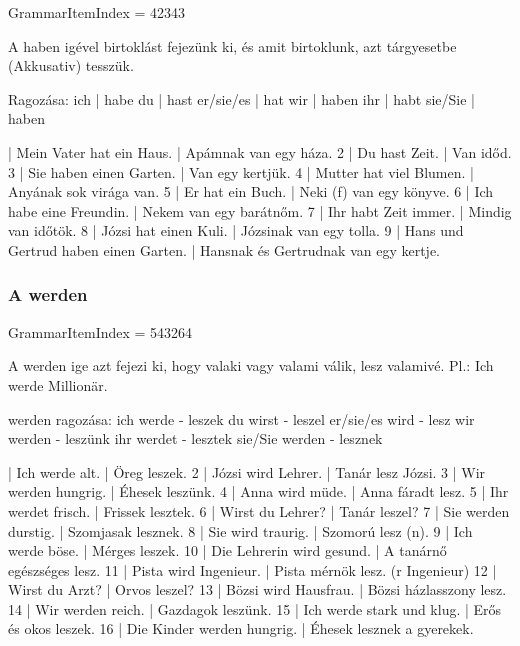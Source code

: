 \documentclass{article}
\newenvironment{desc}{\verbatim}{\endverbatim}
\newenvironment{exmp}{\verbatim}{\endverbatim}
\begin{document}
GrammarItemIndex = 42343

\begin{desc}
A haben igével birtoklást fejezünk ki, és amit birtoklunk, azt tárgyesetbe (Akkusativ) tesszük.

Ragozása:
ich       | habe
du        | hast
er/sie/es | hat
wir       | haben
ihr       | habt
sie/Sie   | haben
\end{desc}

\begin{exmp}
1 | Mein Vater hat ein Haus. | Apámnak van egy háza.
2 | Du hast Zeit. | Van időd.
3 | Sie haben einen Garten. | Van egy kertjük.
4 | Mutter hat viel Blumen. | Anyának sok virága van.
5 | Er hat ein Buch. | Neki (f) van egy könyve.
6 | Ich habe eine Freundin. | Nekem van egy barátnőm.
7 | Ihr habt Zeit immer. | Mindig van időtök.
8 | Józsi hat einen Kuli. | Józsinak van egy tolla.
9 | Hans und Gertrud haben einen Garten. | Hansnak és Gertrudnak van egy kertje.
\end{exmp}

\subsubsection{A werden}

GrammarItemIndex = 543264

\begin{desc}
A werden ige azt fejezi ki, hogy valaki vagy valami válik, lesz
valamivé.
Pl.: Ich werde Millionär.

werden ragozása:
ich werde - leszek 
du wirst - leszel
er/sie/es wird - lesz
wir werden - leszünk
ihr werdet - lesztek
sie/Sie werden - lesznek
\end{desc}

\begin{exmp}
1 | Ich werde alt. | Öreg leszek.
2 | Józsi wird Lehrer. | Tanár lesz Józsi.
3 | Wir werden hungrig. | Éhesek leszünk.
4 | Anna wird müde. | Anna fáradt lesz.
5 | Ihr werdet frisch. | Frissek lesztek.
6 | Wirst du Lehrer? | Tanár leszel?
7 | Sie werden durstig. | Szomjasak lesznek.
8 | Sie wird traurig. | Szomorú lesz (n).
9 | Ich werde böse. | Mérges leszek.
10 | Die Lehrerin wird gesund. | A tanárnő egészséges lesz.
11 | Pista wird Ingenieur. | Pista mérnök lesz. (r Ingenieur)
12 | Wirst du Arzt? | Orvos leszel?
13 | Bözsi wird Hausfrau. | Bözsi házlasszony lesz.
14 | Wir werden reich. | Gazdagok leszünk.
15 | Ich werde stark und klug. | Erős és okos leszek.
16 | Die Kinder werden hungrig. | Éhesek lesznek a gyerekek.
\end{exmp}
\end{document}
